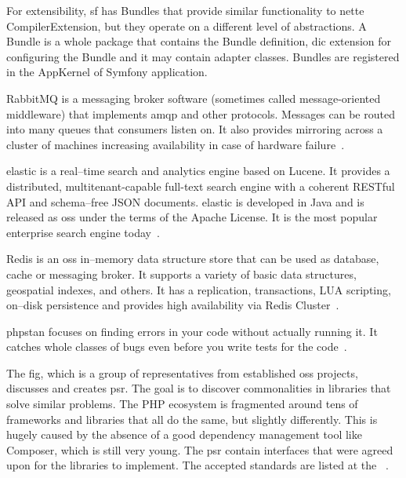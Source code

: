 For extensibility, \gls{sf} has Bundles that provide similar functionality to \gls{nette} CompilerExtension, but they operate on a different level of abstractions. A Bundle is a whole package that contains the Bundle definition, \gls{dic} extension for configuring the Bundle and it may contain adapter classes. Bundles are registered in the AppKernel of Symfony application.

 \label{sec:theory:rabbitmq}

RabbitMQ is a messaging broker software (sometimes called message-oriented middleware) that implements \gls{amqp} and other protocols. Messages can be routed into many queues that consumers listen on. It also provides mirroring across a cluster of machines increasing availability in case of hardware failure~\cite{rabbitmq:features}.

 \label{sec:theory:elasticsearch}

\gls{elastic} is a real--time search and analytics engine based on Lucene. It provides a distributed, multitenant-capable full-text search engine with a coherent RESTful API and schema--free JSON documents. \gls{elastic} is developed in Java and is released as \gls{oss} under the terms of the Apache License. It is the most popular enterprise search engine today~\cite{gormley2015elasticsearch}.

 \label{sec:theory:redis}

Redis is an \gls{oss} in--memory data structure store that can be used as database, cache or messaging broker. It supports a variety of basic data structures, geospatial indexes, and others. It has a replication, transactions, LUA scripting, on--disk persistence and provides high availability via Redis Cluster~\cite{redis:about}.

 \label{sec:theory:phpstan}

\gls{phpstan} focuses on finding errors in your code without actually running it. It catches whole classes of bugs even before you write tests for the code~\cite{github:phpstan}.

 \label{sec:theory:psr}

The \gls{fig}, which is a group of representatives from established \gls{oss} projects, discusses and creates \gls{psr}. The goal is to discover commonalities in libraries that solve similar problems. The PHP ecosystem is fragmented around tens of frameworks and libraries that all do the same, but slightly differently. This is hugely caused by the absence of a good dependency management tool like Composer, which is still very young. The \gls{psr} contain interfaces that were agreed upon for the libraries to implement. The accepted standards are listed at the ~\cite{fig:psr}.

